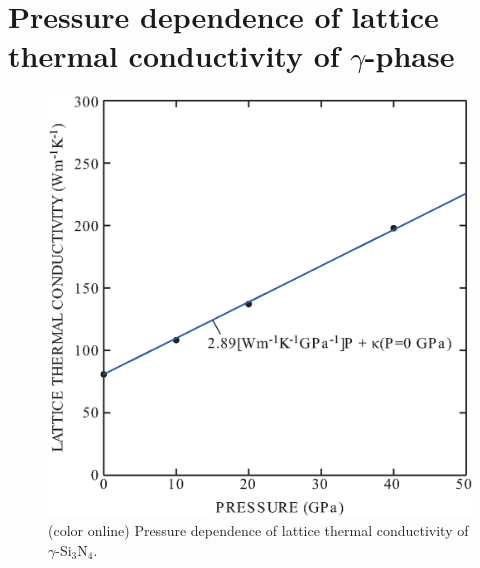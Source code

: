 \documentclass[twocolumn,amsmath,amssymb,a4paper,prb,superscriptaddress,floatfix]{revtex4-1}
\begin{document}
\section{Pressure dependence of lattice thermal conductivity of $\gamma$-phase}
\begin{figure}[ht]
 \begin{center}
  \includegraphics[width=0.80\linewidth]{S1.eps} \caption{(color online)
  Pressure dependence of lattice thermal conductivity of $\gamma$-Si$_3$N$_4$.  \label{fig:S1} }
 \end{center}
\end{figure}

\end{document}
